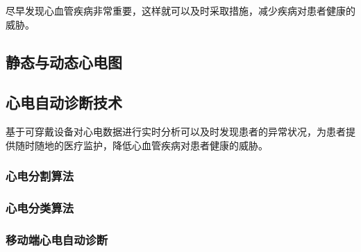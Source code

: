 \documentclass{ecnuthesis}
\begin{document}
    尽早发现心血管疾病非常重要，这样就可以及时采取措施，减少疾病对患者健康的威胁\cite{CardiovascularDiseasesCVDs}。


    \subsection{静态与动态心电图}\label{subsec:static-dynamic}

    \subsection{心电自动诊断技术}\label{subsec:diagnosis}

    基于可穿戴设备对心电数据进行实时分析可以及时发现患者的异常状况，为患者提供随时随地的医疗监护，降低心血管疾病对患者健康的威胁。

    \subsubsection{心电分割算法}\label{subsubsec:segmentation}

    \subsubsection{心电分类算法}\label{subsubsec:classification}

    \subsubsection{移动端心电自动诊断}\label{subsubsec:mobile}
\end{document}
